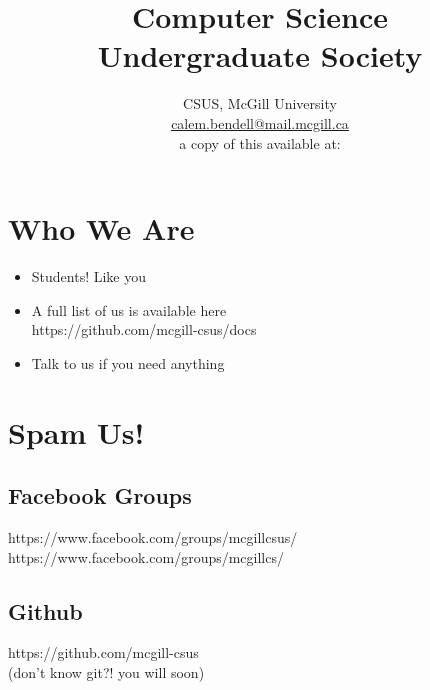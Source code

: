 

\title{Computer Science \\ Undergraduate Society \vspace*{2em}}
\author{
\large
CSUS, McGill University \\
\normalsize \href{mailto:calem.bendell@mail.mcgill.ca}{calem.bendell@mail.mcgill.ca} \\
a copy of this available at: 
}
\date{}



\maketitle

\clearpage

\section{Who We Are}

\begin{itemize}
	\item Students!  Like you
	\item A full list of us is available here \\ https://github.com/mcgill-csus/docs
	\item Talk to us if you need anything
\end{itemize}

\clearpage

\section{Spam Us!}

	\subsection{Facebook Groups}
		
		https://www.facebook.com/groups/mcgillcsus/ \\
		https://www.facebook.com/groups/mcgillcs/
		
	\subsection{Github}
	
		https://github.com/mcgill-csus \\
		(don't know git?!  you will soon)

\clearpage


